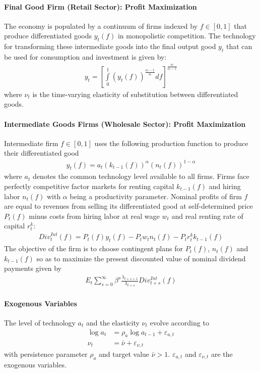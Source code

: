 \documentclass[a4paper]{scrartcl}
\begin{document}
\paragraph{Final Good Firm (Retail Sector): Profit Maximization}
The economy is populated by a continuum of firms indexed by \(f \in [0,1]\) that produce differentiated goods \(y_t(f)\) in monopolistic competition.
The technology for transforming these intermediate goods into the final output good \(y_t\) that can be used for consumption and investment is given by:
\begin{align}
y_t = {\left[\int\limits_0^1 {(y_t(f))}^{\frac{\nu_t-1}{\nu_t}}df\right]}^{\frac{\nu_t}{\nu_t-1}} \label{eq:RBCMonopIrrInv.Firms.Aggregator}
\end{align}
where \(\nu_t\) is the time-varying elasticity of substitution between differentiated goods.

\paragraph{Intermediate Goods Firms (Wholesale Sector): Profit Maximization}
Intermediate firm \(f\in[0,1]\) uses the following production function to produce their differentiated good
\begin{align}
y_t(f) = a_t {(k_{t-1}(f))}^\alpha {(n_t(f))}^{1-\alpha} \label{eq:RBCMonopIrrInv.IntermediateFirms.ProductionFunction}
\end{align}
where \(a_t\) denotes the common technology level available to all firms.
Firms face perfectly competitive factor markets for renting capital \(k_{t-1}(f)\) and hiring labor \(n_t(f)\) with \(\alpha \) being a productivity parameter.
Nominal profits of firm \(f\) are equal to revenues from selling its differentiated good at self-determined price \(P_t(f)\)
  minus costs from hiring labor at real wage \(w_t\) and real renting rate of capital \(r^k_t\):
\begin{align}
{Div}^{Int}_t(f) = P_t(f) y_t(f) - P_t w_t n_t(f) - P_t r^k_t k_{t-1}(f) \label{eq:RBCMonopIrrInv.Firms.Profits}
\end{align}
The objective of the firm is to choose contingent plans for \(P_t(f)\), \(n_t(f)\) and \(k_{t-1}(f)\)
  so as to maximize the present discounted value of nominal dividend payments given by
\begin{align*}
E_t \sum_{s=0}^{\infty} \beta^s \frac{\lambda_{t+s+1}}{\lambda_{t+s}} Div^{Int}_{t+s}(f)
\end{align*}

\paragraph{Exogenous Variables}
The level of technology \(a_t\) and the elasticity \(\nu_t\) evolve according to
\begin{align}
\log{a_t} &= \rho_a \log{a_{t-1}} + \varepsilon_{a,t} \label{eq:RBCMonopIrrInv.LoM.TFP}
\\
\nu_t &= \bar{\nu} + \varepsilon_{\nu,t} \label{eq:RBCMonopIrrInv.LoM.Elast}
\end{align}
with persistence parameter \(\rho_a\) and target value \(\bar{\nu}>1\).
\(\varepsilon_{a,t}\) and \(\varepsilon_{\nu,t}\) are the exogenous variables.
\end{document}

